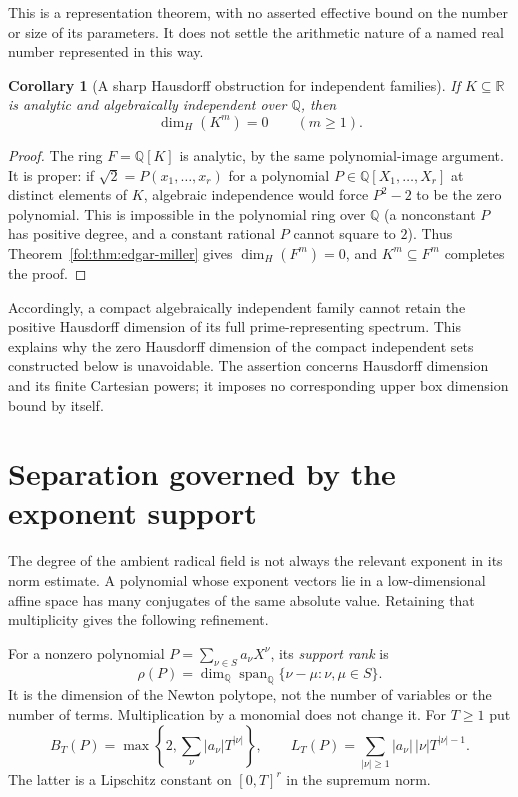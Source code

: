 \documentclass[11pt,a4paper]{article}
\newtheorem{corollary}[theorem]{Corollary}
\theoremstyle{definition}
\theoremstyle{remark}
\numberwithin{equation}{section}
\begin{document}
This is a representation theorem, with no asserted effective bound on the
number or size of its parameters. It does not settle the arithmetic nature
of a named real number represented in this way.

\begin{corollary}[A sharp Hausdorff obstruction for independent families]
\label{fol:cor:analytic-independent-small}
If $K\subseteq\mathbb R$ is analytic and algebraically independent over
$\mathbb Q$, then
\[
 \dim_H(K^m)=0\qquad(m\ge1).
\]
\end{corollary}

\begin{proof}
The ring $F=\mathbb Q[K]$ is analytic, by the same polynomial-image
argument. It is proper: if $\sqrt2=P(x_1,\ldots,x_r)$ for a polynomial
$P\in\mathbb Q[X_1,\ldots,X_r]$ at distinct elements of $K$, algebraic
independence would force $P^2-2$ to be the zero polynomial. This is
impossible in the polynomial ring over $\mathbb Q$ (a nonconstant $P$
has positive degree, and a constant rational $P$ cannot square to $2$).
Thus Theorem~\ref{fol:thm:edgar-miller} gives $\dim_H(F^m)=0$, and
$K^m\subseteq F^m$ completes the proof.
\end{proof}

Accordingly, a compact algebraically independent family cannot retain the
positive Hausdorff dimension of its full prime-representing spectrum.
This explains why the zero Hausdorff dimension of the compact independent
sets constructed below is unavoidable. The assertion concerns Hausdorff
dimension and its finite Cartesian powers; it imposes no corresponding
upper box dimension bound by itself.


\section{Separation governed by the exponent support}
\label{fol:sec:support-separation}

The degree of the ambient radical field is not always the relevant
exponent in its norm estimate.  A polynomial whose exponent vectors lie
in a low-dimensional affine space has many conjugates of the same
absolute value.  Retaining that multiplicity gives the following
refinement.

For a nonzero polynomial $P=\sum_{\nu\in S}a_\nu X^\nu$, its
\emph{support rank} is
\[
 \rho(P)=\dim_{\mathbb Q}\operatorname{span}_{\mathbb Q}
       \{\nu-\mu:\nu,\mu\in S\}.
\]
It is the dimension of the Newton polytope, not the number of variables
or the number of terms. Multiplication by a monomial does not change it.
For $T\ge1$ put
\[
 B_T(P)=\max\left\{2,\sum_{\nu}|a_\nu|T^{|\nu|}\right\},\qquad
 L_T(P)=\sum_{|\nu|\ge1}|a_\nu|\,|\nu|T^{|\nu|-1}.
\]
The latter is a Lipschitz constant on $[0,T]^r$ in the supremum norm.
\end{document}
